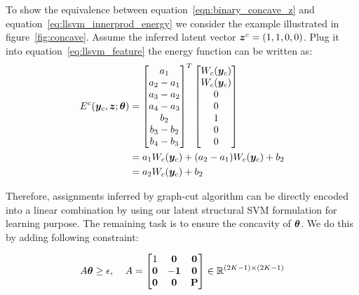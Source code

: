 To show the equivalence between
equation~\eqref{eqn:binary_concave_z} and
equation~\eqref{eq:llsvm_innerprod_energy} we consider the
example illustrated in figure~\ref{fig:concave}. Assume the
inferred latent vector ${\bm{z}}^c=(1,1,0,0)$. Plug it into
equation~\eqref{eq:llsvm_feature} the energy function can be
written as:
\begin{align*}
  E^c({\bm{y}}_c,{\bm{z}}; {\bm{\theta}}) &=
  \begin{bmatrix}
    a_1\\
    a_2-a_1\\
    a_3-a_2\\
    a_4-a_3\\
    b_2\\
    b_3-b_2\\
    b_4-b_3
  \end{bmatrix}^T
  \begin{bmatrix}
    W_c({\bm{y}}_c) \\
    W_c({\bm{y}}_c) \\
    0\\
    0\\
    1\\
    0\\
    0
  \end{bmatrix}\\
  &=a_1W_c({\bm{y}}_c)+(a_2-a_1)W_c({\bm{y}}_c)+b_2\\
  &=a_2W_c({\bm{y}}_c)+b_2
\end{align*}

Therefore, assignments inferred by graph-cut algorithm can be
directly encoded into a linear combination by using our latent
structural SVM formulation for learning purpose. The remaining
task is to ensure the concavity of ${\bm{\theta}}$. We do this by
adding following constraint:

\begin{align}
  \label{eq:concave_constraint}
  A{\bm{\theta}}\geq\epsilon \text{,\;~~~} A=
                  \begin{bmatrix}
                    1 & \mathbf{0} & \mathbf{0}\\
                    \mathbf{0} & -\mathbf{1} & \mathbf{0}\\
                    \mathbf{0} & \mathbf{0} & \mathbf{P}
                  \end{bmatrix}\in \mathbb{R}^{(2K-1)\times(2K-1)}
\end{align}


